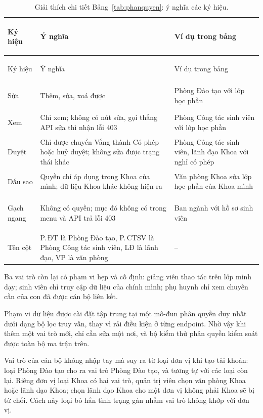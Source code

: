 {\small
\begin{xltabular}{\textwidth}{@{}>{\bfseries\raggedright\arraybackslash\leavevmode}p{2.4cm} >{\raggedright\arraybackslash\leavevmode}X >{\raggedright\arraybackslash\leavevmode}p{5.0cm}@{}}
\caption{Giải thích chi tiết Bảng~\ref{tab:phanquyen}: ý nghĩa các ký hiệu.}
\label{tab:phanquyen-gt}\\
\toprule
Ký hiệu & Ý nghĩa & Ví dụ trong bảng \\
\midrule
\endfirsthead
\toprule
Ký hiệu & Ý nghĩa & Ví dụ trong bảng \\
\midrule
\endhead
\bottomrule
\endfoot
Sửa & Thêm, sửa, xoá được & Phòng Đào tạo với lớp học phần \\
Xem & Chỉ xem; không có nút sửa, gọi thẳng API sửa thì nhận lỗi 403 & Phòng Công tác sinh viên với lớp học phần \\
Duyệt & Chỉ được chuyển Vắng thành Có phép hoặc huỷ duyệt; không sửa được trạng thái khác & Phòng Công tác sinh viên, lãnh đạo Khoa với nghỉ có phép \\
Dấu sao & Quyền chỉ áp dụng trong Khoa của mình; dữ liệu Khoa khác không hiện ra & Văn phòng Khoa sửa lớp học phần của Khoa mình \\
Gạch ngang & Không có quyền; mục đó không có trong menu và API trả lỗi 403 & Ban ngành với hồ sơ sinh viên \\
Tên cột & P.\,ĐT là Phòng Đào tạo, P.\,CTSV là Phòng Công tác sinh viên, LĐ là lãnh đạo, VP là văn phòng & -- \\
\end{xltabular}}


Ba vai trò còn lại có phạm vi hẹp và cố định: giảng viên thao tác trên lớp
mình dạy; sinh viên chỉ truy cập dữ liệu của chính mình; phụ huynh chỉ xem
chuyên cần của con đã được cán bộ liên kết.

\begin{ghinho}
Phạm vi dữ liệu được cài đặt tập trung tại một mô-đun phân quyền duy nhất
dưới dạng bộ lọc truy vấn, thay vì rải điều kiện  ở từng endpoint.
Nhờ vậy khi thêm một vai trò mới, chỉ cần sửa một nơi, và bộ kiểm thử phân
quyền kiểm soát được toàn bộ ma trận trên.
\end{ghinho}

Vai trò của cán bộ không nhập tay mà suy ra từ loại đơn vị khi tạo tài khoản:
loại Phòng Đào tạo cho ra vai trò Phòng Đào tạo, và tương tự với các loại còn
lại. Riêng đơn vị loại Khoa có hai vai trò, quản trị viên chọn văn phòng Khoa
hoặc lãnh đạo Khoa; chọn lãnh đạo Khoa cho một đơn vị không phải Khoa sẽ bị
từ chối. Cách này loại bỏ hẳn tình trạng gán nhầm vai trò không khớp với đơn
vị.

